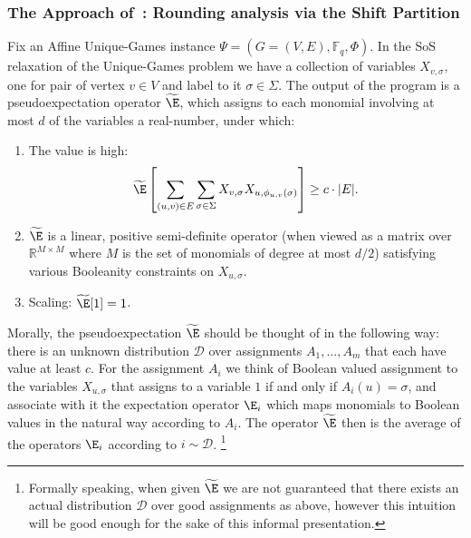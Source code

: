 \subsubsection{The Approach of~\cite{BBKSS}: Rounding analysis via the Shift Partition}
Fix an Affine Unique-Games instance $\Psi = (G=(V,E), \mathbb{F}_q, \Phi)$. 
In the SoS relaxation of the Unique-Games problem we have a collection 
of variables $X_{v,\sigma}$, one for pair of vertex $v\in V$ and label 
to it $\sigma\in \Sigma$. The output of the program is a pseudoexpectation 
operator $\widetilde{\E}$, which assigns to each monomial involving 
at most $d$ of the variables a real-number, under which:
\begin{enumerate}
    \item The value is high:
    \[
    \widetilde{\E}\left[\sum\limits_{(u,v)\in E}\sum\limits_{\sigma\in \Sigma} X_{v,\sigma} X_{u,\phi_{u,v}(\sigma)}\right]\geq c\cdot|E|.
    \]
    \item $\widetilde{\E}$ is a linear, positive semi-definite operator (when viewed as a matrix over $\mathbb{R}^{M\times M}$ where $M$ is the set of monomials of degree at most $d/2$) satisfying various 
    Booleanity constraints on $X_{u,\sigma}$.
    \item Scaling: $\widetilde{\E}[1] = 1$.
\end{enumerate}
Morally, the pseudoexpectation 
$\widetilde{\E}$ should be thought of 
in the following way: 
there is an unknown distribution $\mathcal{D}$ 
over assignments $A_1,\ldots,A_m$ that each have value 
at least $c$. For the 
assignment $A_i$ we think of Boolean valued assignment to 
the variables $X_{u,\sigma}$ that assigns to a variable $1$
if and only if $A_i(u) = \sigma$, and associate with it 
the expectation operator $\E_i$ which maps monomials to 
Boolean values in the natural way according to $A_i$. The operator 
$\widetilde{\E}$ then is the average of the operators $\E_i$ 
according to $i\sim \mathcal{D}$. 
\footnote{Formally speaking,
when given $\widetilde{\E}$ we are not guaranteed that there 
exists an actual distribution $\mathcal{D}$ over good assignments 
as above, however this intuition will be good enough 
for the sake of this informal presentation.}

